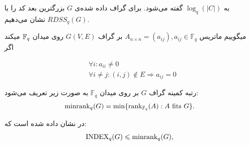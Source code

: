 به
$\log_q(|C|)$
 گفته می‌شود. برای گراف داده شده‌ی $G$ بزرگترین بعد کد را با
 $RDSS_q(G)$
 نشان می‌دهیم.
  \begin{definition}
  	
  	میگوییم ماتریس
  	$A_{n \times n} = (a_{ij}), a_{ij} \in \mathbb{F}_q$
  	بر گراف
  	$G(V, E)$
  	روی میدان
  	${\mathbb{F}_q}$
  	میکند اگر 
  	\begin{latin}
  		\begin{align*}
  			& \forall i : a_{ii} \ne 0 \\
  			& \forall i \ne j:  (i, j) \notin E \Rightarrow a_{ij} = 0
  		\end{align*}
  	\end{latin}
  \end{definition}
 \begin{definition}
 	رتبه کمینه گراف
 	$G$
 	بر روی میدان
 	$\mathbb{F}_q$
 	به صورت زیر تعریف می‌شود:
 	\begin{equation}
 		\mathrm{minrank}_q(G) = \min\{\operatorname{rank}_{\mathbb{F}_q}(A): A \text{ fits } G\}.
 	\end{equation}
 \end{definition}
 \begin{theorem}
 	در
 	\cite{4031356}
 	نشان داده شده است که:
 	\begin{equation}
 		\mathrm{INDEX}_q(G) \leqslant \mathrm{minrank}_q(G),
 		\label{eq:bary}
 	\end{equation} 
 \end{theorem}
